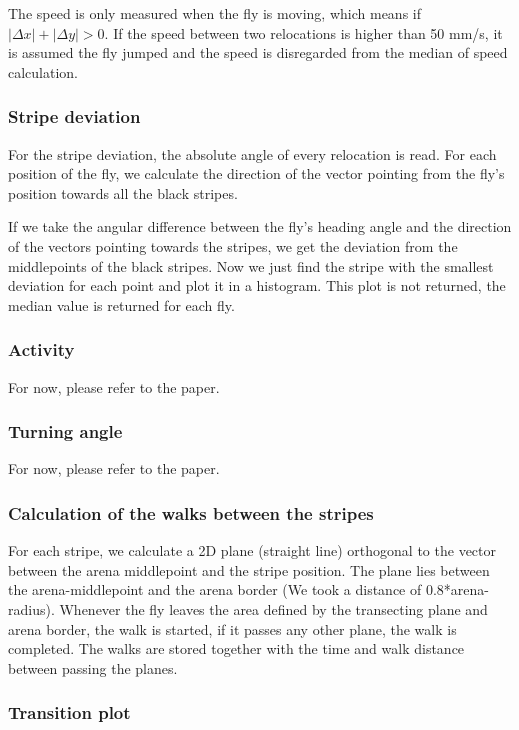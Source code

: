 \documentclass[11pt,a4paper]{article}
\begin{document}
The speed is only measured when the fly is moving, which means if $|\Delta x| + |\Delta y| > 0 $. If the speed between two relocations is higher than 50 mm/s, it is assumed the fly jumped and the speed is disregarded from the median of speed calculation.


\subsubsection{Stripe deviation}

For the stripe deviation, the absolute angle of every relocation is read. For each position of the fly, we calculate the direction of the vector pointing from the fly's position towards all the black stripes. 

If we take the angular difference between the fly's heading angle and the direction of the vectors pointing towards the stripes, we get the deviation from the middlepoints of the black stripes. Now we just find the stripe with the smallest deviation for each point and plot it in a histogram. This plot is not returned, the median value is returned for each fly. 

\subsubsection{Activity}

For now, please refer to the paper.

\subsubsection{Turning angle}

For now, please refer to the paper.

\subsubsection{Calculation of the walks between the stripes}

For each stripe, we calculate a 2D plane (straight line) orthogonal to the vector between the arena middlepoint and the stripe position. The plane lies between the arena-middlepoint and the arena border (We took a distance of 0.8*arena-radius). Whenever the fly leaves the area defined by the transecting plane and arena border, the walk is started, if it passes any other plane, the walk is completed. The walks are stored together with the time and walk distance between passing the planes.

\subsubsection{Transition plot}
\end{document}
